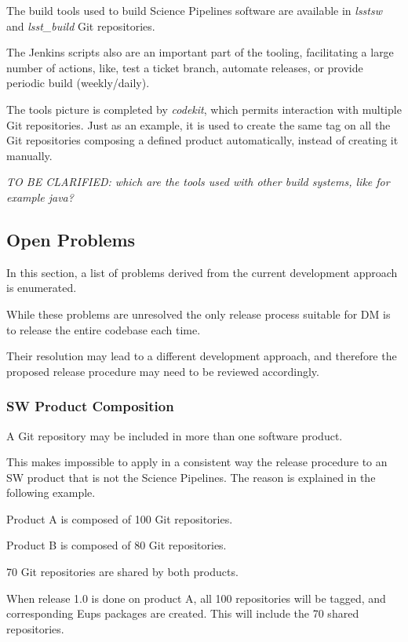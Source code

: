 The build tools used to build Science Pipelines software are available in \textit{lsstsw} and \textit{lsst\_build} Git repositories.

The Jenkins scripts also are an important part of the tooling, facilitating a large number of actions, like, test a ticket branch, automate releases, or provide periodic build (weekly/daily).

The tools picture is completed by \textit{codekit}, which permits interaction with multiple Git repositories.
Just as an example, it is used to create the same tag on all the Git repositories composing a defined product automatically, instead of creating it manually.

\textit{TO BE CLARIFIED: which are the tools used with other build systems, like for example java?}


\subsection{Open Problems} \label{sec:openProblems}

In this section, a list of problems derived from the current development approach is enumerated. 

While these problems are unresolved the only release process suitable for DM is to release the entire codebase each time.

Their resolution may lead to a different development approach, and therefore the proposed release procedure may need to be reviewed accordingly.


\subsubsection{SW Product Composition} \label{sec:problemId}

A Git repository may be included in more than one software product.

This makes impossible to apply in a consistent way the release procedure to an SW product that is not the Science Pipelines.
The reason is explained in the following example.

Product A is composed of 100 Git repositories.

Product B is composed of 80 Git repositories.

70 Git repositories are shared by both products.

When release 1.0 is done on product A, all 100 repositories will be tagged, and corresponding Eups packages are created. This will include the 70 shared repositories.


